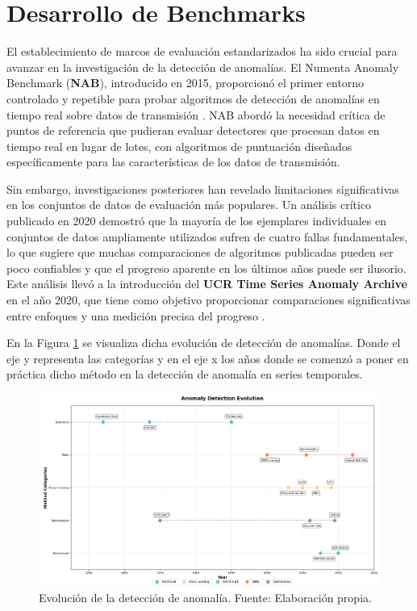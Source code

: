 \section{Desarrollo de Benchmarks}

El establecimiento de marcos de evaluación estandarizados ha sido crucial para avanzar en la investigación de la detección de anomalías. El Numenta Anomaly Benchmark (\textbf{NAB}), introducido en 2015, proporcionó el primer entorno controlado y repetible para probar algoritmos de detección de anomalías en tiempo real sobre datos de transmisión \cite{lavin_evaluating_2015}. NAB abordó la necesidad crítica de puntos de referencia que pudieran evaluar detectores que procesan datos en tiempo real en lugar de lotes, con algoritmos de puntuación diseñados específicamente para las características de los datos de transmisión.

Sin embargo, investigaciones posteriores han revelado limitaciones significativas en los conjuntos de datos de evaluación más populares. Un análisis crítico publicado en 2020 demostró que la mayoría de los ejemplares individuales en conjuntos de datos ampliamente utilizados sufren de cuatro fallas fundamentales, lo que sugiere que muchas comparaciones de algoritmos publicadas pueden ser poco confiables y que el progreso aparente en los últimos años puede ser ilusorio. Este análisis llevó a la introducción del \textbf{UCR Time Series Anomaly Archive} en el año 2020, que tiene como objetivo proporcionar comparaciones significativas entre enfoques y una medición precisa del progreso \cite{wu_current_2023}.

En la Figura \ref{fig:Evolución de la detección de anomalía} se visualiza dicha evolución de detección de anomalías. Donde el eje y representa las categorías y en el eje x los años donde se comenzó a poner en práctica dicho método en la detección de anomalía en series temporales.


\begin{figure}
    \centering
    \includegraphics[width=\paperwidth,height=\paperheight,keepaspectratio,angle=90]{Imagenes/Anomaly Detection Evolution.png}
    \caption{Evolución de la detección de anomalía. Fuente: Elaboración propia.}
    \label{fig:Evolución de la detección de anomalía}
\end{figure}